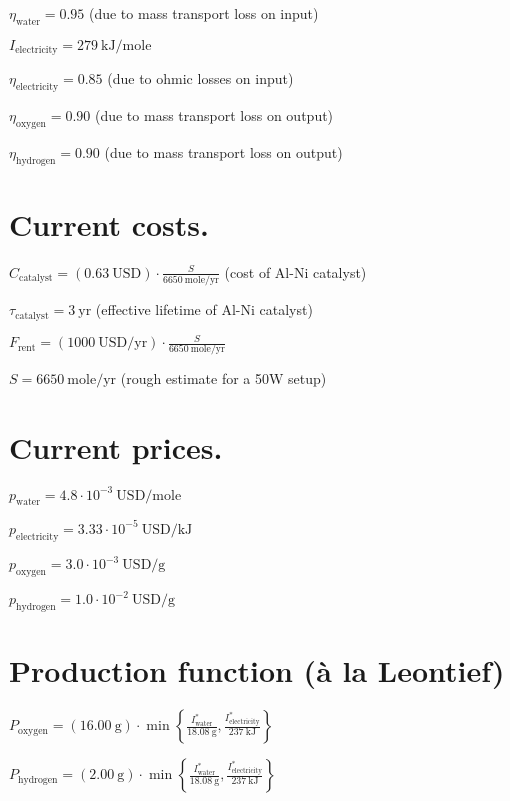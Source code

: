 \documentclass[letterpaper,10pt,english]{sphinxmanual}
\begin{document}
\(\eta_\mathrm{water} = 0.95\) (due to mass transport loss on input)

\(I_\mathrm{electricity} = 279~\mathrm{kJ/mole}\)

\(\eta_\mathrm{electricity} = 0.85\) (due to ohmic losses on input)

\(\eta_\mathrm{oxygen} = 0.90\) (due to mass transport loss on
output)

\(\eta_\mathrm{hydrogen} = 0.90\) (due to mass transport loss on
output)


\section{Current costs.}
\label{\detokenize{example-electrolysis:current-costs}}
\(C_\mathrm{catalyst} = \left( 0.63~\mathrm{USD} \right) \cdot \frac{S}{6650~\mathrm{mole/yr}}\)
(cost of Al-Ni catalyst)

\(\tau_\mathrm{catalyst} = 3~\mathrm{yr}\) (effective lifetime of
Al-Ni catalyst)

\(F_\mathrm{rent} = \left( 1000~\mathrm{USD/yr} \right) \cdot \frac{S}{6650~\mathrm{mole/yr}}\)

\(S = 6650~\mathrm{mole/yr}\) (rough estimate for a 50W setup)


\section{Current prices.}
\label{\detokenize{example-electrolysis:current-prices}}
\(p_\mathrm{water} = 4.8 \cdot 10^{-3}~\mathrm{USD/mole}\)

\(p_\mathrm{electricity} = 3.33 \cdot 10^{-5}~\mathrm{USD/kJ}\)

\(p_\mathrm{oxygen} = 3.0 \cdot 10^{-3}~\mathrm{USD/g}\)

\(p_\mathrm{hydrogen} = 1.0 \cdot 10^{-2}~\mathrm{USD/g}\)


\section{Production function (à la Leontief)}
\label{\detokenize{example-electrolysis:production-function-a-la-leontief}}
\(P_\mathrm{oxygen} = \left( 16.00~\mathrm{g} \right) \cdot \min \left\{ \frac{I^*_\mathrm{water}}{18.08~\mathrm{g}}, \frac{I^*_\mathrm{electricity}}{237~\mathrm{kJ}} \right\}\)

\(P_\mathrm{hydrogen} = \left( 2.00~\mathrm{g} \right) \cdot \min \left\{ \frac{I^*_\mathrm{water}}{18.08~\mathrm{g}}, \frac{I^*_\mathrm{electricity}}{237~\mathrm{kJ}} \right\}\)
\end{document}
